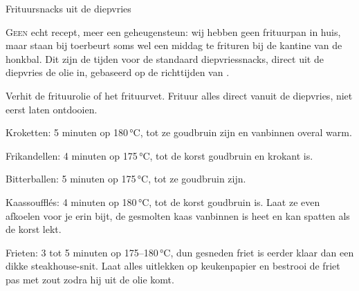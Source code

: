 \begin{recipe}{Frituursnacks uit de diepvries}


\lettrine{G}{een} echt recept, meer een geheugensteun: wij hebben geen
frituurpan in huis, maar staan bij toerbeurt soms wel een middag te
frituren bij de kantine van de honkbal. Dit zijn de tijden voor de
standaard diepvriessnacks, direct uit de diepvries de olie in, gebaseerd
op de richttijden van \cite{snacksite-frituren}.

\begin{ingredients}
\end{ingredients}

\begin{steps}
  \item Verhit de frituurolie of het frituurvet. Frituur alles direct
        vanuit de diepvries, niet eerst laten ontdooien.
  \item Kroketten: 5 minuten op 180\,°C, tot ze goudbruin zijn en
        vanbinnen overal warm.
  \item Frikandellen: 4 minuten op 175\,°C, tot de korst goudbruin en
        krokant is.
  \item Bitterballen: 5 minuten op 175\,°C, tot ze goudbruin zijn.
  \item Kaassoufflés: 4 minuten op 180\,°C, tot de korst goudbruin is.
        Laat ze even afkoelen voor je erin bijt, de gesmolten kaas
        vanbinnen is heet en kan spatten als de korst lekt.
  \item Frieten: 3 tot 5 minuten op 175--180\,°C, dun gesneden friet is
        eerder klaar dan een dikke steakhouse-snit. Laat alles uitlekken
        op keukenpapier en bestrooi de friet pas met zout zodra hij uit
        de olie komt.
\end{steps}
\end{recipe}

